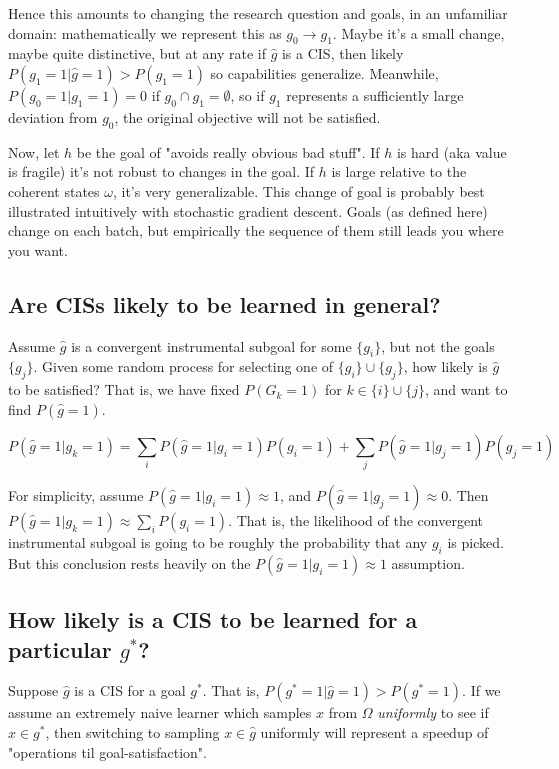 \documentclass{article}
\begin{document}
Hence this amounts to changing the research question and goals, in an unfamiliar domain: mathematically we represent this as $g_0 \rightarrow g_1$. Maybe it's a small change, maybe quite distinctive, but at any rate if $\hat{g}$ is a CIS, then likely $P(g_1=1|\hat{g}=1)>P(g_1=1)$ so capabilities generalize. Meanwhile, $P(g_0=1|g_1=1)=0$ if $g_0 \cap g_1 = \emptyset$, so if $g_1$ represents a sufficiently large deviation from $g_0$, the original objective will not be satisfied.

Now, let $h$ be the goal of "avoids really obvious bad stuff". If $h$ is hard (aka value is fragile) it's not robust to changes in the goal. If $h$ is large relative to the coherent states $\omega$, it's very generalizable. This change of goal is probably best illustrated intuitively with stochastic gradient descent. Goals (as defined here) change on each batch, but empirically the sequence of them still leads you where you want.

\subsection{Are CISs likely to be learned in general?}\label{CIS-general}
Assume $\hat{g}$ is a convergent instrumental subgoal for some $\{g_i\}$, but not the goals $\{g_j\}$. Given some random process for selecting one of $\{g_i\} \cup \{g_j\}$, how likely is $\hat{g}$ to be satisfied? That is, we have fixed $P(G_k=1)$ for $k \in \{i\} \cup \{j\}$, and want to find $P(\hat{g} =1)$.

\[
P(\hat{g}=1|g_k=1)=\sum_i P(\hat{g}=1|g_i=1)P(g_i=1) + \sum_j P(\hat{g}=1|g_j=1)P(g_j=1)
\]

For simplicity, assume $P(\hat{g}=1|g_i=1) \approx 1$, and $P(\hat{g}=1|g_j=1) \approx 0$. Then $P(\hat{g}=1|g_k=1) \approx \sum_i P(g_i=1)$. That is, the likelihood of the convergent instrumental subgoal is going to be roughly the probability that any $g_i$ is picked. But this conclusion rests heavily on the $P(\hat{g}=1|g_i=1) \approx 1$ assumption.

\subsection{How likely is a CIS to be learned for a particular $g^*$?}
Suppose $\hat{g}$ is a CIS for a goal $g^*$. That is, $P(g^*=1|\hat{g}=1)>P(g^*=1)$. If we assume an extremely naive learner which samples $x$ from $\Omega$ \textit{uniformly} to see if $x \in g^*$, then switching to sampling $x \in \hat{g}$ uniformly will represent a speedup of "operations til goal-satisfaction".
\end{document}
